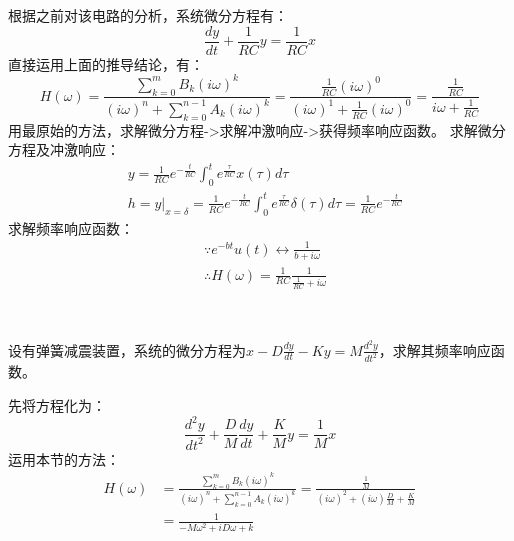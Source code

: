 根据之前对该电路的分析，系统微分方程有：
\[
\frac{dy}{dt}+\frac{1}{RC}y=\frac{1}{RC}x
\]
直接运用上面的推导结论，有：
\[
H\left( \omega \right) =\frac{\sum_{k=0}^m{B_k\left( i\omega \right) ^k}}{\left( i\omega \right) ^n+\sum_{k=0}^{n-1}{A_k\left( i\omega \right) ^k}}=\frac{\frac{1}{RC}\left( i\omega \right) ^0}{\left( i\omega \right) ^1+\frac{1}{RC}\left( i\omega \right) ^0}=\frac{\frac{1}{RC}}{i\omega +\frac{1}{RC}}
\]
用最原始的方法，求解微分方程->求解冲激响应->获得频率响应函数。
求解微分方程及冲激响应：
\begin{align*}
&y=\frac{1}{RC}e^{-\frac{t}{RC}}\int_0^t{e^{\frac{\tau}{RC}}x\left( \tau \right) d\tau} \\
&h=\left. y \right|_{x=\delta}=\frac{1}{RC}e^{-\frac{t}{RC}}\int_0^t{e^{\frac{\tau}{RC}}\delta \left( \tau \right) d\tau}=\frac{1}{RC}e^{-\frac{t}{RC}}
\end{align*}
求解频率响应函数：
\begin{align*}
&\because e^{-bt}u\left( t \right) \leftrightarrow \frac{1}{b+i\omega} \\
&\therefore H\left( \omega \right) =\frac{1}{RC}\frac{1}{\frac{1}{RC}+i\omega}
\end{align*}

~

\begin{example}
设有弹簧减震装置，系统的微分方程为$x-D\frac{dy}{dt}-Ky=M\frac{d^2y}{dt^2}$，求解其频率响应函数。
\end{example}

先将方程化为：
\[
\frac{d^2y}{dt^2}+\frac{D}{M}\frac{dy}{dt}+\frac{K}{M}y=\frac{1}{M}x
\]
运用本节的方法：
\begin{align*}
H\left( \omega \right) &=\frac{\sum_{k=0}^m{B_k\left( i\omega \right) ^k}}{\left( i\omega \right) ^n+\sum_{k=0}^{n-1}{A_k\left( i\omega \right) ^k}}=\frac{\frac{1}{M}}{\left( i\omega \right) ^2+\left( i\omega \right) \frac{D}{M}+\frac{K}{M}} \\
&=\frac{1}{-M\omega ^2+iD\omega +k}
\end{align*}




